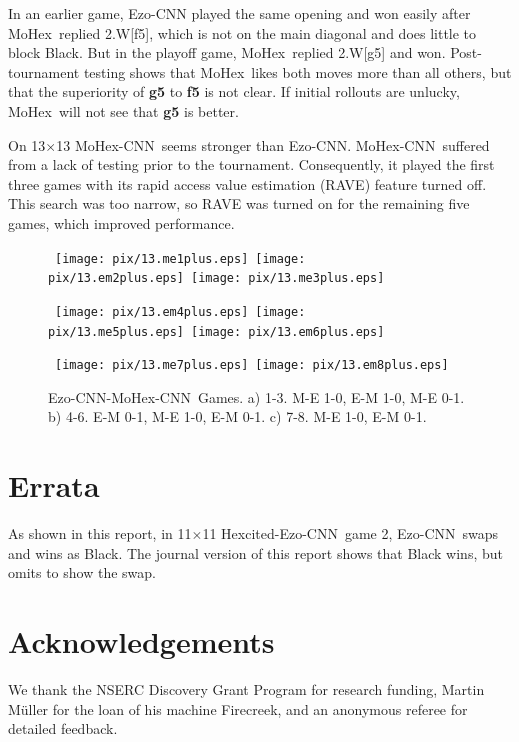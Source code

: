 \documentclass{IOS-Book-Article}
\def\Ec{\mbox{\sc Ezo-CNN}}
\def\Hite{\mbox{\sc Hexcited}}
\def\Mx{\mbox{\sc MoHex}}
\def\Mc{\mbox{\sc MoHex-CNN}}
\begin{document}
In an earlier game, \Ec{} played the same opening
and won easily after \Mx\ replied 2.W[f5], 
which is not on the main diagonal and does little to block Black.
But in the playoff game, \Mx\ replied 2.W[g5] and won.
Post-tournament testing shows that \Mx\ likes both moves more than all others,
but that the superiority of {\bf g5} to {\bf f5} is not clear.
If initial rollouts are unlucky, \Mx\ will not see that {\bf g5} is better.

On 13$\times$13 \Mc\ seems stronger than \Ec.
\Mc\ suffered from a lack of testing prior to the tournament.
Consequently, it played the first three games with 
its rapid access value estimation (RAVE)
feature turned off. This search was too narrow, 
so RAVE was turned on for the remaining five games, which improved
performance.

\begin{figure}
\noindent\hspace*{-2cm}\
\texttt{[image: pix/13.me1plus.eps]}\hspace*{-1.8cm}\
\texttt{[image: pix/13.em2plus.eps]}\hspace*{-1.8cm}\
\texttt{[image: pix/13.me3plus.eps]}
\smallskip

\noindent\hspace*{-2cm}\
\texttt{[image: pix/13.em4plus.eps]}\hspace*{-1.8cm}\
\texttt{[image: pix/13.me5plus.eps]}\hspace*{-1.8cm}\
\texttt{[image: pix/13.em6plus.eps]}\
\smallskip

\noindent\hspace*{-.4cm}\
\texttt{[image: pix/13.me7plus.eps]}\hspace*{-1.8cm}\
\texttt{[image: pix/13.em8plus.eps]}
\caption{\Ec{}-\Mc\ Games. 
a) 1-3. M-E 1-0, E-M 1-0, M-E 0-1.
b) 4-6. E-M 0-1, M-E 1-0, E-M 0-1.
c) 7-8. M-E 1-0, E-M 0-1.}
\label{fig:EM13}
\end{figure}
\fi

\section*{Errata}
As shown in this report,
in 11$\times$11 \Hite-\Ec\ game 2, \Ec\ swaps and wins as Black.
The journal version of this report shows that Black wins,
but omits to show the swap.

\section*{Acknowledgements}
We thank the NSERC Discovery Grant Program for research funding,
Martin M\"{u}ller for the loan of his machine Firecreek, and
an anonymous referee for detailed feedback.


\end{document}
